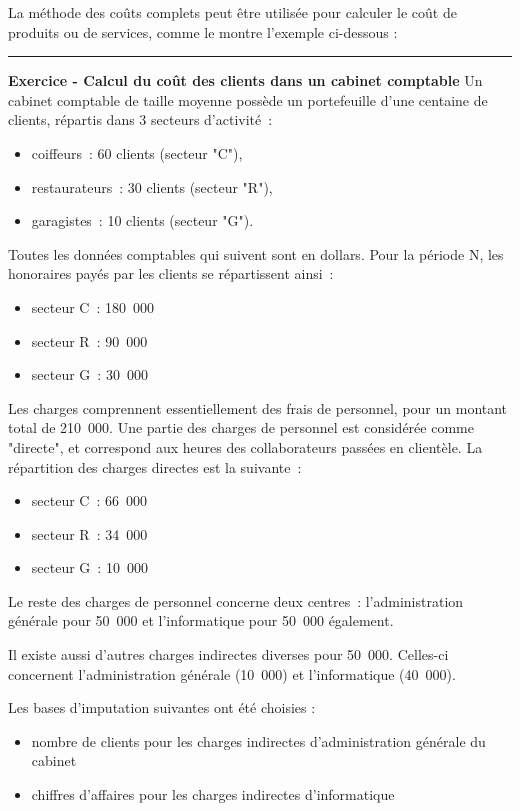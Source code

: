 \documentclass[oneside]{kaobook}
\begin{document}
La méthode des coûts complets peut être utilisée pour calculer le coût de produits ou de services, comme le montre l'exemple ci-dessous :

\noindent\rule{\textwidth}{0.5pt}
\textbf{Exercice - Calcul du coût des clients dans un cabinet comptable}
Un cabinet comptable de taille moyenne possède un portefeuille d'une centaine de clients, répartis dans 3 secteurs d'activité :
\begin{itemize}
\item coiffeurs : 60 clients (secteur "C"),
\item restaurateurs : 30 clients (secteur "R"),
\item garagistes : 10 clients (secteur "G").
\end{itemize}
Toutes les données comptables qui suivent sont en dollars. Pour la période N, les honoraires payés par les clients se répartissent ainsi :
\begin{itemize}
\item secteur C : 180 000
\item secteur R : 90 000
\item secteur G : 30 000
\end{itemize}
Les charges comprennent essentiellement des frais de personnel, pour un montant total de 210 000. Une partie des charges de personnel est considérée comme "directe", et correspond aux heures des collaborateurs passées en clientèle. La répartition des charges directes est la suivante :
\begin{itemize}
\item secteur C : 66 000
\item secteur R : 34 000
\item secteur G : 10 000
\end{itemize}
Le reste des charges de personnel concerne deux centres : l'administration générale pour 50 000 et l'informatique pour 50 000 également.

Il existe aussi d'autres charges indirectes diverses pour 50 000. Celles-ci concernent l'administration générale (10 000) et l'informatique (40 000).

Les bases d'imputation suivantes ont été choisies :
\begin{itemize}
\item nombre de clients pour les charges indirectes d'administration générale du cabinet
\item chiffres d'affaires pour les charges indirectes d'informatique
\end{itemize}
\end{document}
